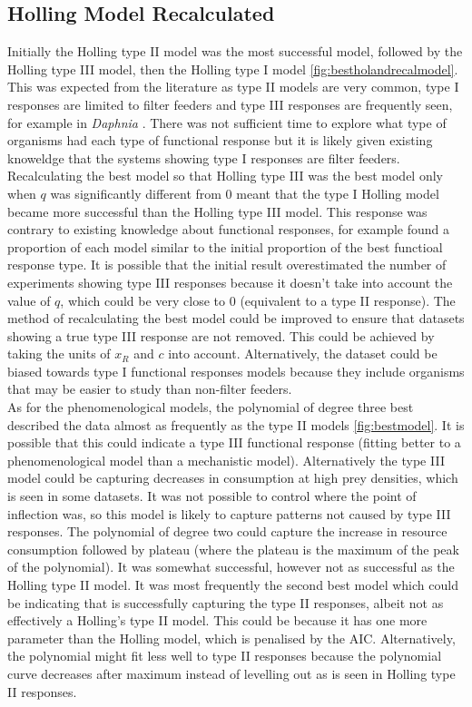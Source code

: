 \documentclass{article}
\begin{document}
\subsection{Holling Model Recalculated}
Initially the Holling type II model was the most successful model, followed by the Holling type III model, then the Holling type I model \ref{fig:bestholandrecalmodel}. This was expected from the literature as type II models are very common, type I responses are limited to filter feeders \cite{Jeschke2004Consumer-foodFeeders} and type III responses are frequently seen, for example in \textit{Daphnia} \cite{Sarnelle2008TypeDaphnia}. There was not sufficient time to explore what type of organisms had each type of functional response but it is likely given existing knoweldge that the systems showing type I responses are filter feeders. Recalculating the best model so that Holling type III was the best model only when $q$ was significantly different from $0$ meant that the type I Holling model became more successful than the Holling type III model. This response was contrary to existing knowledge about functional responses, for example \cite{Dunn2020PredatorHabitats} found a proportion of each model similar to the initial proportion of the best functioal response type. It is possible that the initial result overestimated the number of experiments showing type III responses because it doesn't take into account the value of $q$, which could be very close to $0$ (equivalent to a type II response). The method of recalculating the best model could be improved to ensure that datasets showing a true type III response are not removed. This could be achieved by taking the units of $x_R$ and $c$ into account. Alternatively, the dataset could be biased towards type I functional responses models because they include organisms that may be easier to study than non-filter feeders\cite{Jeschke2004Consumer-foodFeeders}.
\\
As for the phenomenological models, the polynomial of degree three best described the data almost as frequently as the type II models \ref{fig:bestmodel}. It is possible that this could indicate a type III functional response (fitting better to a phenomenological model than a mechanistic model). Alternatively the type III model could be capturing decreases in consumption at high prey densities, which is seen in some datasets. It was not possible to control where the point of inflection was, so this model is likely to capture patterns not caused by type III responses. The polynomial of degree two could capture the increase in resource consumption followed by plateau (where the plateau is the maximum of the peak of the polynomial). It was somewhat successful, however not as successful as the Holling type II model. It was most frequently the second best model which could be indicating that is successfully capturing the type II responses, albeit not as effectively a Holling's type II model. This could be because it has one more parameter than the Holling model, which is penalised by the AIC. Alternatively, the polynomial might fit less well to type II responses because the polynomial curve decreases after maximum instead of levelling out as is seen in Holling type II responses. 
\end{document}
